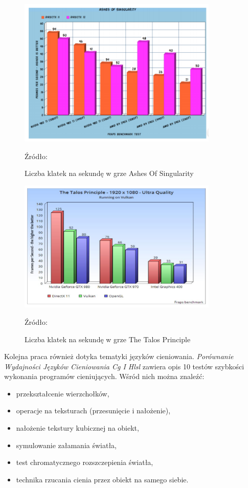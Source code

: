\documentclass[archive]{mgr}
\begin{document}
\newpage

\begin{figure}[h!]
  \centering
    \includegraphics[width=0.85\textwidth]{images/lit/11.png}
   \caption{Liczba klatek na sekundę w grze Ashes Of Singularity}
   Źródło: \cite{lit3}
   \label{lab:liter21}
\end{figure}

\begin{figure}[h!]
  \centering
    \includegraphics[width=0.85\textwidth]{images/lit/12.png}
   \caption{Liczba klatek na sekundę w grze The Talos Principle}
   Źródło: \cite{lit3}
   \label{lab:liter22}
\end{figure}

\newpage

Kolejna praca również dotyka tematyki języków cieniowania. \emph{Porównanie Wydajności Języków Cieniowania Cg I Hlsl} \cite{lit4} zawiera opis 10 testów szybkości wykonania programów cieniujących. Wśród nich można znaleźć:

\begin{itemize}
  \item przekształcenie wierzchołków,
  \item operacje na teksturach (przesunięcie i nałożenie),
  \item nałożenie tekstury kubicznej na obiekt,
  \item symulowanie załamania światła,
  \item test chromatycznego rozszczepienia światła,
  \item technika rzucania cienia przez obiekt na samego siebie.
\end{itemize}
\end{document}
